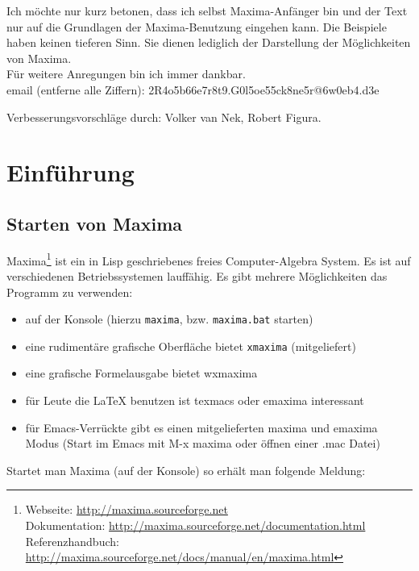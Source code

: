 \documentclass[ngerman,12pt]{scrartcl}
\begin{document}
\vspace{1cm}

Ich möchte nur kurz betonen, dass ich selbst Maxima-Anfänger bin und der Text nur auf die Grundlagen der Maxima-Benutzung eingehen kann. Die Beispiele haben keinen tieferen Sinn. Sie dienen lediglich der Darstellung der Möglichkeiten von Maxima.\\
Für weitere Anregungen bin ich immer dankbar\@.\\
email (entferne alle Ziffern): 2R4o5b66e7r8t9.G0l5oe55ck8ne5r@6w0eb4.d3e

\vspace{1cm}
Verbesserungsvorschläge durch: Volker van Nek, Robert Figura.

\newpage
\section{Einführung}

\subsection{Starten von Maxima}

Maxima\footnote
{Webseite: \url{http://maxima.sourceforge.net} \\
Dokumentation: \url{http://maxima.sourceforge.net/documentation.html} \\
Referenzhandbuch: \url{http://maxima.sourceforge.net/docs/manual/en/maxima.html}}
ist ein in Lisp geschriebenes freies Computer-Algebra System. Es ist
auf verschiedenen Betriebssystemen lauffähig.
Es gibt mehrere Möglichkeiten das Programm zu verwenden:

\begin{itemize}
\item auf der Konsole (hierzu \texttt{maxima}, bzw. \texttt{maxima.bat} starten)
\item eine rudimentäre grafische Oberfläche bietet \texttt{xmaxima} (mitgeliefert)
\item eine grafische Formelausgabe bietet wxmaxima
\item für Leute die \LaTeX{} benutzen ist texmacs oder emaxima interessant
\item für Emacs-Verrückte gibt es einen mitgelieferten maxima und
  emaxima Modus (Start im Emacs mit M-x maxima oder öffnen einer {.mac} Datei)
\end{itemize}

Startet man Maxima (auf der Konsole) so erhält man folgende Meldung:
\end{document}
